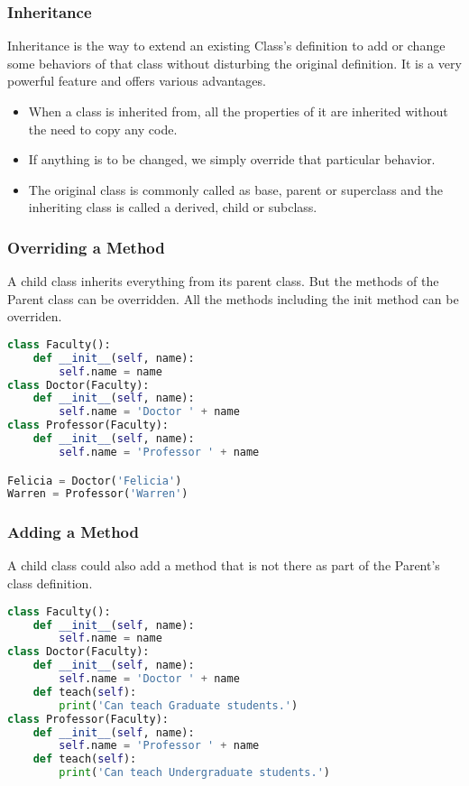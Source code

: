 \documentclass{beamer}
\begin{document}
\begin{frame}
\frametitle{Inheritance}
Inheritance is the way to extend an existing Class's definition to add or change some behaviors of that class without disturbing the original definition. 
It is a very powerful feature and offers various advantages.
\begin{itemize}
\item  When a class is inherited from, all the properties of it are inherited without the need to copy any code.
\item If anything is to be changed, we simply override that particular behavior.
\item The original class is commonly called as base, parent or superclass and the inheriting class is called a derived, child or subclass.

\end{itemize}
\end{frame}

\begin{frame}[fragile]
\frametitle{Overriding a Method}
A child class inherits everything from its parent class. But the methods of the Parent class can be overridden.
All the methods including the init method can be overriden.
\begin{lstlisting}[language=Python]
class Faculty():
	def __init__(self, name):
		self.name = name
class Doctor(Faculty):
	def __init__(self, name):
		self.name = 'Doctor ' + name
class Professor(Faculty):
	def __init__(self, name):
		self.name = 'Professor ' + name

Felicia = Doctor('Felicia')
Warren = Professor('Warren')
\end{lstlisting}
\end{frame}

\begin{frame}[fragile]
\frametitle{Adding a Method}
A child class could also add a method that is not there as part of the Parent's class definition.
\begin{lstlisting}[language=Python]
class Faculty():
    def __init__(self, name):
        self.name = name
class Doctor(Faculty):
    def __init__(self, name):
        self.name = 'Doctor ' + name
    def teach(self):
        print('Can teach Graduate students.')
class Professor(Faculty):
    def __init__(self, name):
        self.name = 'Professor ' + name
    def teach(self):
        print('Can teach Undergraduate students.')
\end{lstlisting}
\end{frame}
\end{document}
